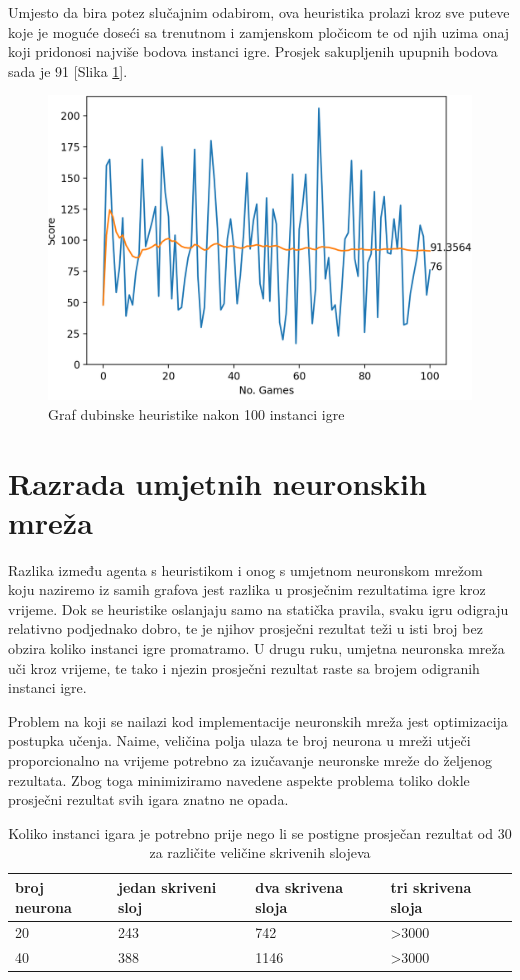 \documentclass[zavrsnirad]{fer}
\begin{document}
Umjesto da bira potez slučajnim odabirom, ova heuristika prolazi kroz sve puteve koje je moguće doseći sa trenutnom i zamjenskom pločicom te od njih uzima onaj koji pridonosi najviše bodova instanci igre. Prosjek sakupljenih upupnih bodova sada je 91 [Slika \ref{slk:depth_graph}].

\begin{figure}[htb]
	\centering
	\includegraphics[width=0.58\linewidth]{Figures/depth.png} 
	\caption{Graf dubinske heuristike nakon 100 instanci igre}
	\label{slk:depth_graph}
\end{figure}


\chapter{Razrada umjetnih neuronskih mreža}
\label{pog:razrada_neuronske}

Razlika između agenta s heuristikom i onog s umjetnom neuronskom mrežom koju naziremo iz samih grafova jest razlika u prosječnim rezultatima igre kroz vrijeme. Dok se heuristike oslanjaju samo na statička pravila, svaku igru odigraju relativno podjednako dobro, te je njihov prosječni rezultat teži u isti broj bez obzira koliko instanci igre promatramo. U drugu ruku, umjetna neuronska mreža uči kroz vrijeme, te tako i njezin prosječni rezultat raste sa brojem odigranih instanci igre.

Problem na koji se nailazi kod implementacije neuronskih mreža jest optimizacija postupka učenja. Naime, veličina polja ulaza te broj neurona u mreži utječi proporcionalno na vrijeme potrebno za izučavanje neuronske mreže do željenog rezultata. Zbog toga minimiziramo navedene aspekte problema toliko dokle prosječni rezultat svih igara znatno ne opada.

\begin{table}[]
	\centering
	\begin{tabular}{|l|lll|}
		\hline
		broj neurona & jedan skriveni sloj & dva skrivena sloja & tri skrivena sloja \\ \hline
		20                                    & 243                 & 742                & \textgreater{}3000 \\
		40                                    & 388                 & 1146               & \textgreater{}3000 \\ \hline
	\end{tabular}
	\caption{Koliko instanci igara je potrebno prije nego li se postigne prosječan rezultat od 30 za različite veličine skrivenih slojeva}
	\label{tab:velicina_mreze}
\end{table}
\end{document}
